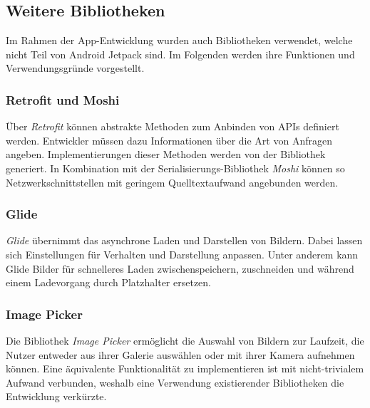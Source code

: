 \documentclass[a4paper, 11pt]{article}
\begin{document}
\subsection{Weitere Bibliotheken}
\label{subsec:app:bibs}
Im Rahmen der App-Entwicklung wurden auch Bibliotheken verwendet, welche nicht Teil von Android Jetpack sind.
Im Folgenden werden ihre Funktionen und Verwendungsgründe vorgestellt.

\subsubsection{Retrofit und Moshi}
\label{subsubsec:app:bibs:retrofitmoshi}
Über \textit{Retrofit} können abstrakte Methoden zum Anbinden von APIs definiert werden.
Entwickler müssen dazu Informationen über die Art von Anfragen angeben.
Implementierungen dieser Methoden werden von der Bibliothek generiert.
In Kombination mit der Serialisierungs-Bibliothek \textit{Moshi} können so Netzwerkschnittstellen mit geringem Quelltextaufwand angebunden werden.

\subsubsection{Glide}
\label{subsubsec:app:bibs:glide}
\textit{Glide} übernimmt das asynchrone Laden und Darstellen von Bildern.
Dabei lassen sich Einstellungen für Verhalten und Darstellung anpassen.
Unter anderem kann Glide Bilder für schnelleres Laden zwischenspeichern, zuschneiden und während einem Ladevorgang durch Platzhalter ersetzen.

\subsubsection{Image Picker}
\label{subsubsec:app:bibs:imagepicker}
Die Bibliothek \textit{Image Picker} ermöglicht die Auswahl von Bildern zur Laufzeit, die Nutzer entweder aus ihrer Galerie auswählen oder mit ihrer Kamera aufnehmen können.
Eine äquivalente Funktionalität zu implementieren ist mit nicht-trivialem Aufwand verbunden, weshalb eine Verwendung existierender Bibliotheken die Entwicklung verkürzte.
\end{document}
